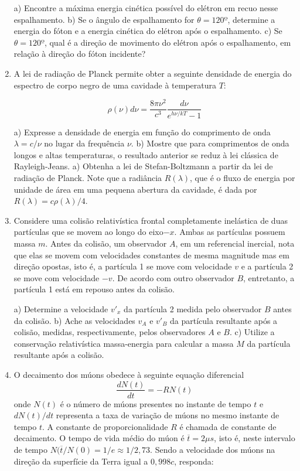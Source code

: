 \begin{enumerate}[start=1,label={\bfseries Q\arabic*.}]
a) Encontre a máxima energia cinética possível do elétron em recuo nesse espalhamento.
b) Se o ângulo de espalhamento for $\theta = 120º$, determine a energia do fóton e a energia cinética do elétron após o espalhamento.
c) Se $\theta = 120º$, qual é a direção de movimento do elétron após o espalhamento, em relação à direção do fóton incidente?




\item A lei de radiação de Planck permite obter a seguinte densidade de energia do espectro de corpo negro de uma cavidade à temperatura $T$:

$$
\rho(\nu) d \nu=\frac{8 \pi \nu^{2}}{c^{3}} \frac{d \nu}{e^{h \nu / k T}-1}
$$


  a) Expresse a densidade de energia em função do comprimento de onda $\lambda = c/\nu$ no lugar da frequência $\nu$.
  b) Mostre que para comprimentos de onda longos e altas temperaturas, o resultado anterior se reduz à lei clássica de Rayleigh-Jeans.
  a) Obtenha a lei de Stefan-Boltzmann a partir da lei de radiação de Planck. Note que a radiância $R(\lambda)$, que é o fluxo de energia por unidade de área em uma pequena abertura da cavidade, é dada por $R(\lambda) = c\rho(\lambda)/4$.



\item Considere uma colisão relativística frontal completamente inelástica de duas partículas que se movem ao longo do eixo$-x$. Ambas as partículas possuem massa $m$. Antes da colisão, um observador $A$, em um referencial inercial, nota que elas se movem com velocidades constantes de mesma magnitude mas em direção opostas, isto é, a partícula 1 se move com velocidade $v$ e a partícula 2 se move com velocidade $-v$. De acordo com outro observador $B$, entretanto, a partícula 1 está em repouso antes da colisão.


a) Determine a velocidade $v'_{x}$ da partícula 2 medida pelo observador $B$ antes da colisão.
b) Ache as velocidades $v_{A}$ e $v'_{B}$ da partícula resultante após a colisão, medidas, respectivamente, pelos observadores $A$ e $B$.
c) Utilize a conservação relativística massa-energia para calcular a massa $M$ da partícula resultante após a colisão.



\item O decaimento dos múons obedece à seguinte equação diferencial
$$
\frac{dN(t)}{dt} = - R N(t)
$$
onde $N(t)$ é o número de múons presentes no instante de tempo $t$ e $dN(t)/dt$ representa a taxa de variação de múons no mesmo instante de tempo $t$. A constante de proporcionalidade $R$ é chamada de constante de decaimento. O tempo de vida médio do múon é $\overline{t} = 2\mu s$, isto é, neste intervalo de tempo $N(\overline{t}/N(0) = 1/e \approx 1/2,73$. Sendo a velocidade dos múons na direção da superfície da Terra igual a $0,998c$, responda:



\end{enumerate}
